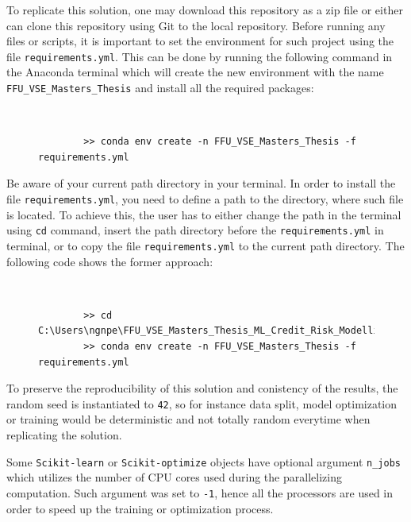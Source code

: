     To replicate this solution, one may download this repository as a zip file or either can clone this repository using Git to the local repository. Before running any files or scripts, it is important to set the environment for such project using the file \texttt{requirements.yml}. This can be done by running the following command in the Anaconda terminal which will create the new environment with the name \texttt{FFU\_VSE\_Masters\_Thesis} and install all the required packages:
    \begin{figure}[H]
        \centering\
    {\footnotesize
    \begin{verbatim}
        >> conda env create -n FFU_VSE_Masters_Thesis -f requirements.yml    
    \end{verbatim}
    \vspace{-1em}
    }
    \end{figure}
    Be aware of your current path directory in your terminal. In order to install the file \texttt{requirements.yml}, you need to define a path to the directory, where such file is located.
    To achieve this, the user has to either change the path in the terminal using \texttt{cd} command, insert the path directory before the \texttt{requirements.yml} in terminal, or to copy the file \texttt{requirements.yml} to the current path directory. The following code shows the former approach:
    \begin{figure}[H]
        \centering\
    {\footnotesize
    \begin{verbatim}
        >> cd C:\Users\ngnpe\FFU_VSE_Masters_Thesis_ML_Credit_Risk_Modelling
        >> conda env create -n FFU_VSE_Masters_Thesis -f requirements.yml   
    \end{verbatim}
    \vspace{-1em}
    }
    \end{figure}


    To preserve the reproducibility of this solution and conistency of the results, the random seed is instantiated to \texttt{42}, so for instance data split, model optimization or training would be deterministic and not totally random everytime when replicating the solution.

    Some \lstinline{Scikit-learn} or \lstinline{Scikit-optimize} objects have optional argument \texttt{n\_jobs} which utilizes the number of CPU cores used during the parallelizing computation. Such argument was set to \texttt{-1}, hence all the processors are used in order to  speed up the training or optimization process.


